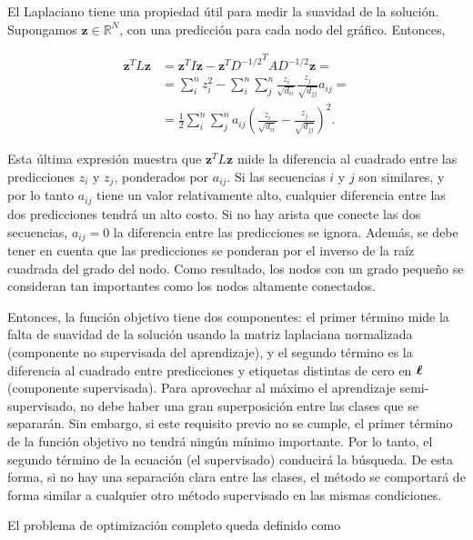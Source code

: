 \noindent El Laplaciano tiene una propiedad útil para medir la suavidad de la solución. Supongamos $\mathbf{z} \in \mathbb{R} ^ N$, con una predicción para cada nodo
del gráfico. Entonces,

\begin{equation}
	\begin{split}
		\mathbf{z}^T L \mathbf{z} & = \mathbf{z}^T I \mathbf{z} - \mathbf{z}^T {D^{-1/2}}^T A D^{-1/2} \mathbf{z} = \\
					  & = \sum_{i}^{n} z_{i}^{2} -  \sum_{i}^{n}  \sum_{j}^{n} \frac{z_{i}}{\sqrt{d_{ii}}} \frac{z_{j}}{\sqrt{d_{jj}}}
		a_{ij} = \\
		& = \frac{1}{2} \sum_{i}^{n} \sum_{j}^{n} a_{ij} \left(\frac{z_{i}}{ \sqrt{d_{ii}}} - \frac{z_{j}}{\sqrt{d_{jj}}}
	\right)^{2}.
\end{split}
\end{equation}

\noindent Esta última expresión muestra que $\mathbf {z} ^ T L \mathbf {z}$ mide la diferencia al cuadrado entre las predicciones $z_{i}$ y $z_{j}$, ponderados
por $a_{ij} $. Si las secuencias $ i $ y $ j $ son similares, y por lo tanto $ a_{ij} $ tiene un valor relativamente alto, cualquier diferencia entre las dos
predicciones tendrá un alto costo. Si no hay arista que conecte las dos secuencias, $a_{ij} = 0 $ la diferencia entre las predicciones se ignora. Además, se
debe tener en cuenta que las predicciones se ponderan por el inverso de la raíz cuadrada del grado del nodo. Como resultado, los nodos con un grado pequeño se
consideran tan importantes como los nodos altamente conectados.

Entonces, la función objetivo tiene dos componentes: el primer término mide la falta de suavidad de la solución usando la matriz laplaciana normalizada
(componente no supervisada del aprendizaje), y el segundo término es la diferencia al cuadrado entre predicciones y etiquetas distintas de cero en $\boldsymbol\ell$
(componente supervisada). Para aprovechar al máximo el aprendizaje semi-supervisado, no debe haber una gran superposición entre las clases que se separarán. Sin
embargo, si este requisito previo no se cumple, el primer término de la función objetivo no tendrá ningún mínimo importante. Por lo tanto, el segundo término de
la ecuación (el supervisado) conducirá la búsqueda. De esta forma, si no hay una separación clara entre las clases, el método se comportará de forma similar a
cualquier otro método supervisado en las mismas condiciones.

El problema de optimización completo queda definido como

